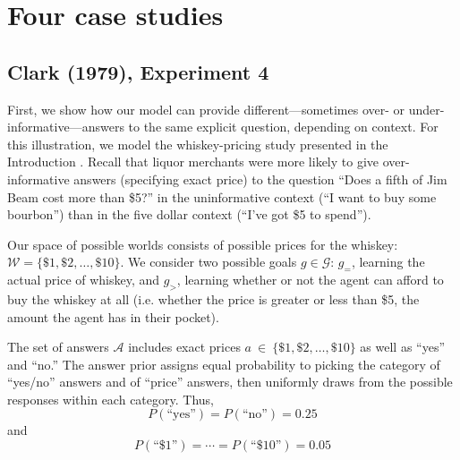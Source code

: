 \documentclass[12pt, floatsintext, jou]{apa6}
\begin{document}
\section{Four case studies}


\subsection{Clark (1979), Experiment 4}
First, we show how our model can provide different---sometimes over- or under-informative---answers to the same explicit question, depending on context. For this illustration, we model the whiskey-pricing study presented in the Introduction \cite{Clark79_IndirectSpeechActs}. Recall that liquor merchants were more likely to give over-informative answers (specifying exact price) to the question ``Does a fifth of Jim Beam cost more than \$5?'' in the uninformative context (``I want to buy some bourbon'') than in the five dollar context (``I've got \$5 to spend'').

Our space of possible worlds consists of possible prices for the whiskey: $\mathcal{W} = \{\$1, \$2, \dots, \$10\}$. We consider two possible goals $g \in \mathcal{G}$: $g_=$, learning the actual price of whiskey,  and $g_>$, learning whether or not the agent can afford to buy the whiskey at all (i.e. whether the price is greater or less than \$5, the amount the agent has in their pocket). %

The set of answers $\mathcal{A}$ includes exact prices $a~\in~\{\$1, \$2, \dots, \$10\}$ as well as ``yes'' and ``no.'' The answer prior assigns equal probability to picking the category of ``yes/no'' answers and of ``price'' answers, then uniformly draws from the possible responses within each category. Thus, $$P(\textrm{``yes''}) = P(\textrm{``no''}) = 0.25$$ and $$P(\textrm{``\$1''}) = \cdots = P(\textrm{``\$10''}) = 0.05$$
\end{document}
